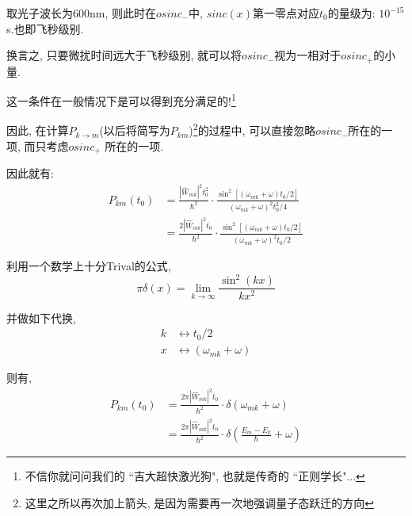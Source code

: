 \documentclass[a4paper, 11pt]{article}
\begin{document}
\begin{spacing}{1.2}
        取光子波长为600nm, 则此时在$osinc_-$中, $sinc(x)$第一零点对应$t_0$的量级为: 
        $10^{-15}$s.也即飞秒级别.

        换言之, 只要微扰时间远大于飞秒级别, 就可以将$osinc_-$视为一相对于$osinc_+$的小量.

        这一条件在一般情况下是可以得到充分满足的!\footnote{不信你就问问我们的 ``吉大超快激光狗", 
        也就是传奇的 ``正则学长"...}

        因此, 在计算$P_{k\to m}$(以后将简写为$P_{km}$)\footnote{这里之所以再次加上箭头, 
        是因为需要再一次地强调量子态跃迁的方向}的过程中, 可以直接忽略$osinc_-$所在的一项, 
        而只考虑$osinc_+$
        所在的一项.

        因此就有:
        \begin{equation}
          \begin{aligned}
            P_{km}(t_0) & = \frac{|\hat{W}_{mk}|^2t_0^2}{\hbar^2}\cdot
            \frac{\sin^2[(\omega_{mk}+\omega)t_0/2]}{(\omega_{mk}+\omega)^2t_0^2/4}\\
            & = \frac{2|\hat{W}_{mk}|^2t_0}{\hbar^2}\cdot
            \frac{\sin^2[(\omega_{mk}+\omega)t_0/2]}{(\omega_{mk}+\omega)^2t_0/2}
          \end{aligned}
        \end{equation}

        利用一个数学上十分Trival的公式,
        \begin{equation}
          \label{deltalim}
          \pi\delta(x) = \lim_{k\to\infty}\frac{\sin^2(kx)}{kx^2}
        \end{equation}

        并做如下代换,
        \begin{equation}
          \begin{aligned}
            k & \longleftrightarrow t_0/2\\
            x & \longleftrightarrow (\omega_{mk}+\omega)
          \end{aligned}
        \end{equation}

        则有,
        \begin{equation}
          \begin{aligned}
            P_{km}(t_0) & = \frac{2\pi|\hat{W}_{mk}|^2t_0}{\hbar^2}
            \cdot\delta(\omega_{mk}+\omega)\\
            & = \frac{2\pi|\hat{W}_{mk}|^2t_0}{\hbar^2}
            \cdot\delta(\frac{E_m-E_k}{\hbar}+\omega)
          \end{aligned}
        \end{equation}


\end{spacing}
\end{document}
